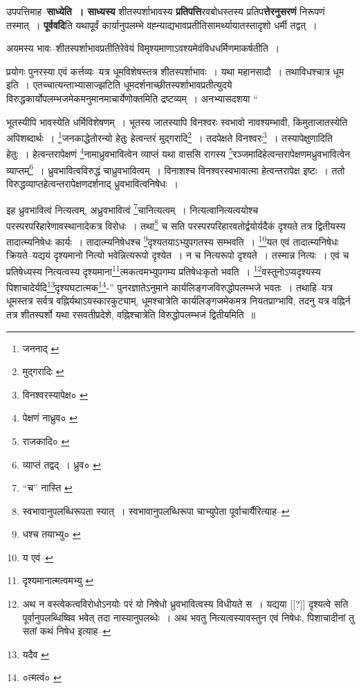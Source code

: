 \documentclass[article,12pt,a4paper]{memoir}
\begin{document}
	  \pstart उपपत्तिमाह--\textbf{साध्येति । साध्यस्य} शीतस्पर्शाभावस्य \textbf{प्रतिपत्ति}रवबोधस्तस्य प्रतिप\textbf{त्तेरनुसरणं} निरूपणं तस्मात् । \textbf{पूर्ववदि}ति यथापूर्वं कार्यानुपलम्भे वह्न्याद्यभावप्रतीतिसामर्थ्यायातस्तादृशो धर्मी तद्वत् ।
	\pend
      

	  \pstart अयमस्य भावः--शीतस्पर्शाभावप्रतीतिरेवेयं विमृश्यमाणाऽवश्यमेवंविधधर्मिणमाकर्षतीति ।
	\pend
      

	  \pstart प्रयोगः पुनरस्या एवं कर्त्तव्यः--यत्र धूमविशेषस्तत्र शीतस्पर्शाभावः । यथा महानसादौ । तथाविधश्चात्र धूम इति । एतच्चात्यन्ताभ्यासाज्झटिति धूमदर्शनाच्छीतस्पर्शाभावप्रतीत्युदये विरुद्धकार्योपलम्भजमेकमनुमानमाचार्येणोक्तमिति द्रष्टव्यम् । अनभ्यासदशया  \leavevmode{} “
	  
	भूतस्यीपि भावस्येति धर्मिविशेषणम् । भूतस्य जातस्यापि विनश्वरः स्वभावो नावश्यम्भावी, किमुताजातस्येति अपिशब्दार्थः । \footnote{जननाद् \cite{dp-msA} \cite{dp-edP} \cite{dp-edH} \cite{dp-edE}}जनकाद्धेतोरन्यो हेतुः हेत्वन्तरं मुद्गरादि\footnote{मुद्गरादिः \cite{dp-msC}} । तदपेक्षते विनश्वरः\footnote{विनश्वरस्यापेक्ष० \cite{dp-msA}} । तस्यापेक्षुणादिति हेतुः । हेत्वन्तरापेक्षणं \footnote{पेक्षणं नाध्रुव० \cite{dp-msB}}नामाध्रुवभावित्वेन व्याप्तं यथा वाससि रागस्य \footnote{राजकादि० \cite{dp-msB} \cite{dp-msC} \cite{dp-msD}}रञ्जमादिहेत्वन्तरापेक्षणमध्रुवभावित्वेन व्याप्तम्\footnote{व्याप्तं तद्वद् । ध्रुव० \cite{dp-msC}} । ध्रुवभावित्वविरुद्धं चाध्रुवभावित्वम् । विनाशश्च विनश्वरस्वभावात्मा हेत्वन्तरापेक्ष इष्टः । ततो विरुद्धव्याप्तहेत्वन्तरापेक्षणदर्शनाद् ध्रुवभावित्वनिषेधः । 
	  
	इह ध्रुवभावित्वं नित्यत्वम्, अध्रुवभावित्वं \footnote{“च” नास्ति \cite{dp-msB} \cite{dp-msD}}चानित्यत्वम् । नित्यत्वानित्यत्वयोश्च परस्परपरिहारेणावस्थानादेकत्र विरोधः । तथा\footnote{स्वभावानुपलब्धिरूपता स्यात् । स्वभावानुपलब्धिरूपा चाभ्युपेता पूर्वाचार्यैरित्याह--\cite{dp-msD-n}} च सति परस्परपरिहारवतोर्द्वयोर्यदैकं दृश्यते तत्र द्वितीयस्य तादात्म्यनिषेधः कार्यः । तादात्म्यनिषेधश्च \footnote{धश्च तयाभ्यु० \cite{dp-msA}}दृश्यतयाऽभ्युपगतस्य सम्भवति । \footnote{य एवं--\cite{dp-msA}}यत एवं तादात्म्यनिषेधः क्रियते--यद्ययं दृश्यमानो नित्यो भवेन्नित्यरूपो दृश्येत । न च नित्यरूपो दृश्यते । तस्मान्न नित्यः । एवं च प्रतिषेध्यस्य नित्यत्वस्य दृश्यमाना\footnote{दृश्यमानात्मत्वमभ्यु \cite{dp-msA} \cite{dp-edP} \cite{dp-edH} \cite{dp-edE} \cite{dp-edN}}त्मकत्वमभ्युपगम्य प्रतिषेधःकृतो भवति । \footnote{अथ न वस्त्वेकत्वविरोधोऽनयोः परं यो निषेधो ध्रुवभावित्वस्य विधीयते स । यद्यया [[?]] दृश्यत्वे सति पूर्वानुपलब्धिष्विव भवेत् तदा नास्यानुपलब्धेः । अथ भवतु नित्यत्वस्यावस्तुन एवं निषेधः, पिशाचादीनां तु सतां कथं निषेध इत्याह--\cite{dp-msD-n}}वस्तुनोऽप्यदृश्यस्य पिशाचादेर्यदि\footnote{यदैव \cite{dp-msB}}दृश्यघटात्मक\footnote{०त्मत्वं० \cite{dp-msA} \cite{dp-edP} \cite{dp-edH} \cite{dp-edE} \cite{dp-edN}}-” पुनरज्ञातेऽनुमाने कार्यलिङ्गजविरुद्धोपलम्भजे भवतः । तथाहि--यत्र धूमस्तत्र सर्वत्र वह्निर्यथाऽयस्कारकुट्याम्, धूमश्चात्रेति कार्यलिङ्गजमेकमत्र नियतप्राग्भावि, तदनु यत्र वह्निर्न तत्र शीतस्पर्शो यथा रसवतीप्रदेशे, वह्निश्चात्रेति विरुद्धोपलम्भजं द्वितीयमिति ॥
	\pend
      
\end{document}
